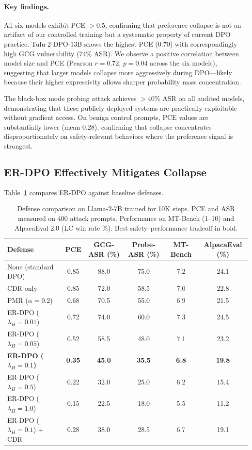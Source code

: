 \paragraph{Key findings.} All six models exhibit PCE $> 0.5$, confirming that preference collapse is not an artifact of our controlled training but a systematic property of current DPO practice. Tulu-2-DPO-13B shows the highest PCE (0.70) with correspondingly high GCG vulnerability (74\% ASR). We observe a positive correlation between model size and PCE (Pearson $r = 0.72$, $p = 0.04$ across the six models), suggesting that larger models collapse more aggressively during DPO---likely because their higher expressivity allows sharper probability mass concentration.

The black-box mode probing attack achieves $> 40\%$ ASR on all audited models, demonstrating that these publicly deployed systems are practically exploitable without gradient access. On benign control prompts, PCE values are substantially lower (mean 0.28), confirming that collapse concentrates disproportionately on safety-relevant behaviors where the preference signal is strongest.

\subsection{ER-DPO Effectively Mitigates Collapse}
\label{sec:res_defense}

Table~\ref{tab:defense} compares ER-DPO against baseline defenses.

\begin{table}[t]
\centering
\caption{Defense comparison on Llama-2-7B trained for 10K steps. PCE and ASR measured on 400 attack prompts. Performance on MT-Bench (1--10) and AlpacaEval 2.0 (LC win rate \%). Best safety--performance tradeoff in bold.}
\label{tab:defense}
\small
\begin{tabular}{@{}lccccc@{}}
\toprule
Defense & PCE & GCG-ASR (\%) & Probe-ASR (\%) & MT-Bench & AlpacaEval (\%) \\
\midrule
None (standard DPO) & 0.85 & 88.0 & 75.0 & 7.2 & 24.1 \\
CDR only            & 0.85 & 72.0 & 58.5 & 7.0 & 22.8 \\
PMR ($\alpha = 0.2$) & 0.68 & 70.5 & 55.0 & 6.9 & 21.5 \\
ER-DPO ($\lambda_H = 0.01$) & 0.72 & 74.0 & 60.0 & 7.3 & 24.5 \\
ER-DPO ($\lambda_H = 0.05$) & 0.52 & 58.5 & 48.0 & 7.1 & 23.2 \\
\textbf{ER-DPO ($\lambda_H = 0.1$)} & \textbf{0.35} & \textbf{45.0} & \textbf{35.5} & \textbf{6.8} & \textbf{19.8} \\
ER-DPO ($\lambda_H = 0.5$) & 0.22 & 32.0 & 25.0 & 6.2 & 15.4 \\
ER-DPO ($\lambda_H = 1.0$) & 0.15 & 22.5 & 18.0 & 5.5 & 11.2 \\
\midrule
ER-DPO ($\lambda_H = 0.1$) + CDR & 0.28 & 38.0 & 28.5 & 6.7 & 19.1 \\
\bottomrule
\end{tabular}
\end{table}

